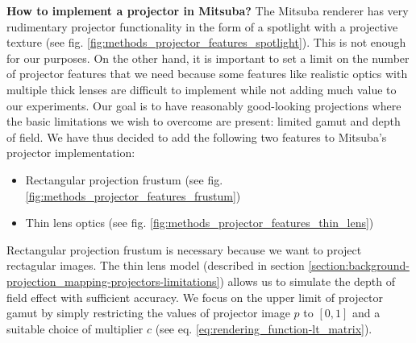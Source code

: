 \textbf{How to implement a projector in Mitsuba?} The Mitsuba renderer has very rudimentary projector functionality in the form of a spotlight with a projective texture (see fig. \ref{fig:methods_projector_features_spotlight}). This is not enough for our purposes. On the other hand, it is important to set a limit on the number of projector features that we need because some features like realistic optics with multiple thick lenses are difficult to implement while not adding much value to our experiments. Our goal is to have reasonably good-looking projections where the basic limitations we wish to overcome are present: limited gamut and depth of field. We have thus decided to add the following two features to Mitsuba's projector implementation:

\begin{itemize}
    \item Rectangular projection frustum (see fig. \ref{fig:methods_projector_features_frustum})
    \item Thin lens optics (see fig. \ref{fig:methods_projector_features_thin_lens})
\end{itemize}

Rectangular projection frustum is necessary because we want to project rectagular images. The thin lens model (described in section \ref{section:background-projection_mapping-projectors-limitations}) allows us to simulate the depth of field effect with sufficient accuracy. We focus on the upper limit of projector gamut by simply restricting the values of projector image \(p\) to \([0, 1]\) and a suitable choice of multiplier \(c\) (see eq. \ref{eq:rendering_function-lt_matrix}).

